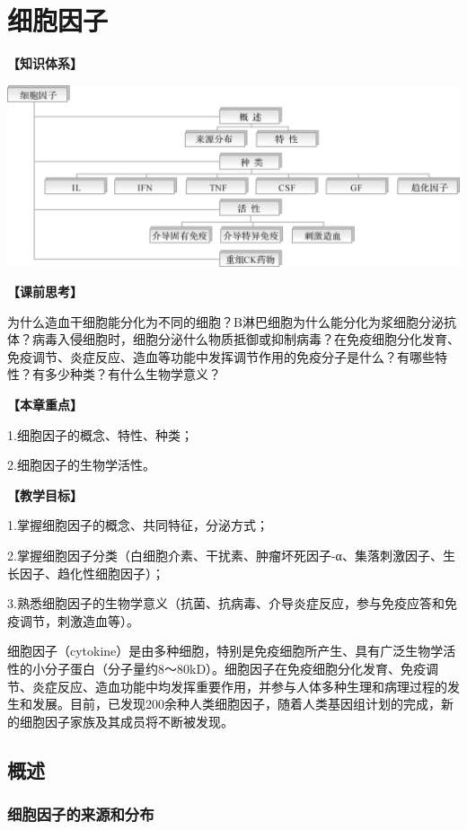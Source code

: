 \chapter{细胞因子}
\begin{framed}
\noindent\textbf{【知识体系】}
\begin{center}
\includegraphics{./images/Image00090.jpg}
\end{center}
\noindent\textbf{【课前思考】}

为什么造血干细胞能分化为不同的细胞？B淋巴细胞为什么能分化为浆细胞分泌抗体？病毒入侵细胞时，细胞分泌什么物质抵御或抑制病毒？在免疫细胞分化发育、免疫调节、炎症反应、造血等功能中发挥调节作用的免疫分子是什么？有哪些特性？有多少种类？有什么生物学意义？

\noindent\textbf{【本章重点】}

1.细胞因子的概念、特性、种类；

2.细胞因子的生物学活性。

\noindent\textbf{【教学目标】}

1.掌握细胞因子的概念、共同特征，分泌方式；

2.掌握细胞因子分类（白细胞介素、干扰素、肿瘤坏死因子-α、集落刺激因子、生长因子、趋化性细胞因子）；

3.熟悉细胞因子的生物学意义（抗菌、抗病毒、介导炎症反应，参与免疫应答和免疫调节，刺激造血等）。

细胞因子（cytokine）是由多种细胞，特别是免疫细胞所产生、具有广泛生物学活性的小分子蛋白（分子量约8～80kD）。细胞因子在免疫细胞分化发育、免疫调节、炎症反应、造血功能中均发挥重要作用，并参与人体多种生理和病理过程的发生和发展。目前，已发现200余种人类细胞因子，随着人类基因组计划的完成，新的细胞因子家族及其成员将不断被发现。
\end{framed}
\section{概述}


\subsection{细胞因子的来源和分布}

